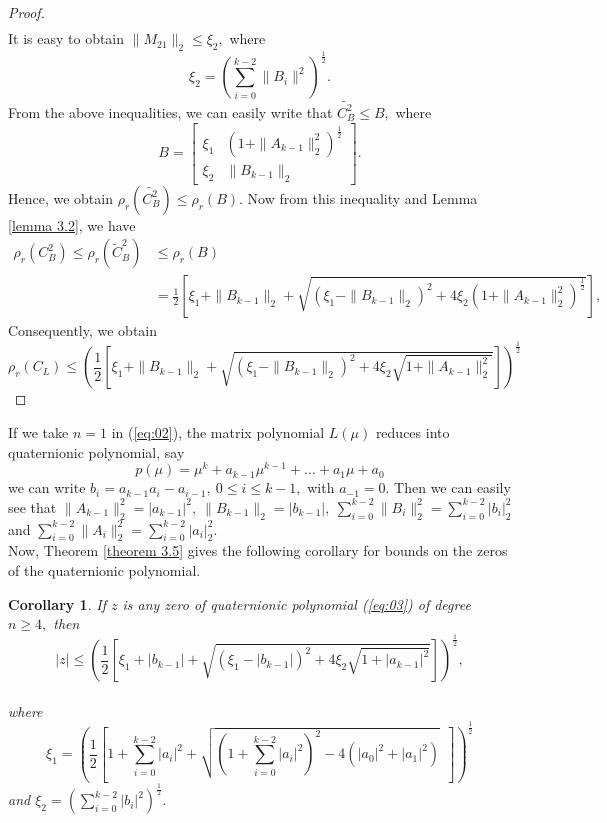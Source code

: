 \documentclass [12pt]{article}
\newtheorem{corollary}{Corollary}
[theorem]
\begin{document}
\begin{proof}
\begin{align*}
\end{align*}
It is easy to obtain $\|M_{21}\|_{2}\le\xi_{2},$ where \begin{equation*}
    \xi_{2}=\left( \sum_{i=0}^{k-2} \|B_{i}\|^{2}\right)^{\frac{1}{2}}.
\end{equation*}
From the above inequalities, we can easily write that $\tilde{C^{2}_{B}}\le B,$ where \[
B = \begin{bmatrix} \xi_{1} & \left( 1+\|A_{k-1}\|^{2}_{2}\right)^\frac{1}{2} \\ \xi_{2}& \|B_{k-1}\|_{2} \end{bmatrix}.
\]
Hence, we obtain $
    \rho_{r}(\tilde{C^{2}_{B}})\le \rho_{r}(B).$
Now from this inequality and Lemma \ref{lemma 3.2}, we have 
\begin{align*}
    \rho_r(C^{2}_{B}) \leq \rho_r(\tilde{C}^{2}_B) &\le \rho_{r}(B)\\&= \frac{1}{2} \left[ \xi_{1} + \|B_{k-1}\|_2 + \sqrt{\left( \xi_{1} - \|B_{k-1}\|_2  \right)^2 + 4 \xi_{2}\left( 1+\|A_{k-1}\|^{2}_{2}\right)^\frac{1}{2} }
\right],
\end{align*}
Consequently, we obtain \begin{equation*}
 \rho_r(C_{L})\le \left( \frac{1}{2} \left[ \xi_{1}+\|B_{k-1}\|_{2}  +\sqrt{(\xi_{1}-\|B_{k-1}\|_{2})^{2}+4\xi_{2} \sqrt{1+\|A_{k-1}\|^{2}_{2}}} \right] \right)^{\frac{1}{2}}
\end{equation*}
\end{proof}
\noindent If we take $n=1$ in (\ref{eq:02}), the matrix polynomial $L(\mu)$ reduces into quaternionic polynomial, say
 \begin{equation}
     p(\mu)=\mu^{k}+a_{k-1}\mu^{k-1}+\dots+a_{1}\mu+a_{0}\label{eq:03}
 \end{equation}
  we can write $b_{i}=a_{k-1}a_{i}-a_{i-1},~0\le i \le k-1, $ with $a_{-1}=0.$ Then we can easily see that $\|A_{k-1}\|^{2}_{2}=|a_{k-1}|^{2},~ \|B_{k-1}\|_{2}=|b_{k-1}|, ~ \sum_{i=0}^{k-2}\|B_{i}\|^{2}_{2}=\sum_{i=0}^{k-2}|b_{i}|_{2}^{2}$ and $ \sum_{i=0}^{k-2}\|A_{i}\|^{2}_{2}=\sum_{i=0}^{k-2}|a_{i}|_{2}^{2}.$\\
   Now, Theorem \ref{theorem 3.5} gives the following corollary for bounds on the zeros of the quaternionic polynomial.


\begin{corollary}
    If $z$ is any zero of quaternionic polynomial (\ref{eq:03}) of degree $n\ge 4,$ then 
    \begin{equation*}
|z| \le \left( \frac{1}{2} \left[  \xi_{1}+|b_{k-1}|  + \sqrt{(\xi_{1}-|b_{k-1}|)^{2}+4\xi_{2} \sqrt{1+|a_{k-1}|^{2}}} \right] \right)^{\frac{1}{2}},
\end{equation*}\\
where \begin{equation*}
\xi_{1} = \left( \frac{1}{2} \left[ 1+\sum_{i=0}^{k-2}|a_{i}|^{2}  +  \sqrt{\left(1+\sum_{i=0}^{k-2}|a_{i}|^{2}\right)^{2}-4\left(|a_{0}|^{2}+|a_{1}|^{2}\right)} ~~\right] \right)^{\frac{1}{2}}
\end{equation*}
and 
$\xi_{2}=\left( \sum_{i=0}^{k-2}|b_{i}|^{2}\right)^\frac{1}{2}.$

\end{corollary}
\end{document}
